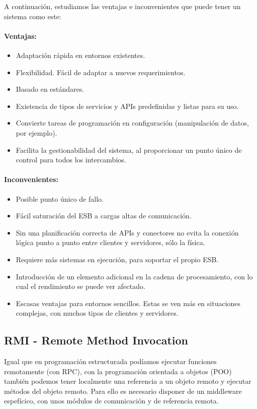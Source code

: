 A continuación, estudiamos las ventajas e inconvenientes que puede tener un sistema como este:
\paragraph{Ventajas:}
\begin{itemize}
\item Adaptación rápida en entornos existentes.
\item Flexibilidad. Fácil de adaptar a nuevos requerimientos.
\item Basado en estándares.
\item Existencia de tipos de servicios y APIs predefinidas y listas para su uso.
\item Convierte tareas de programación en configuración (manipulación de datos, por ejemplo).
\item Facilita la gestionabilidad del sistema, al proporcionar un punto único de control para todos los intercambios.
\end{itemize}
\paragraph{ Inconvenientes:}
\begin{itemize}
\item Posible punto único de fallo.
\item Fácil saturación del ESB a cargas altas de comunicación.
\item Sin una planificación correcta de APIs y conectores no evita la conexión lógica punto a punto entre clientes y servidores, sólo la física.
\item Requiere más sistemas en ejecución, para soportar el propio ESB.
\item Introducción de un elemento adicional en la cadena de procesamiento, con lo cual el rendimiento se puede ver afectado.
\item Escasas ventajas para entornos sencillos. Estas se ven más en situaciones complejas, con muchos tipos de clientes y servidores.
\end{itemize}

\subsection{RMI - Remote Method Invocation}

Igual que en programación estructurada podíamos ejecutar funciones remotamente (con RPC), con la programación orientada a objetos (POO) también podemos tener localmente una referencia a un objeto remoto y ejecutar métodos del objeto remoto. Para ello es necesario disponer de un middleware espefícico, con unos módulos de comunicación y de referencia remota.


